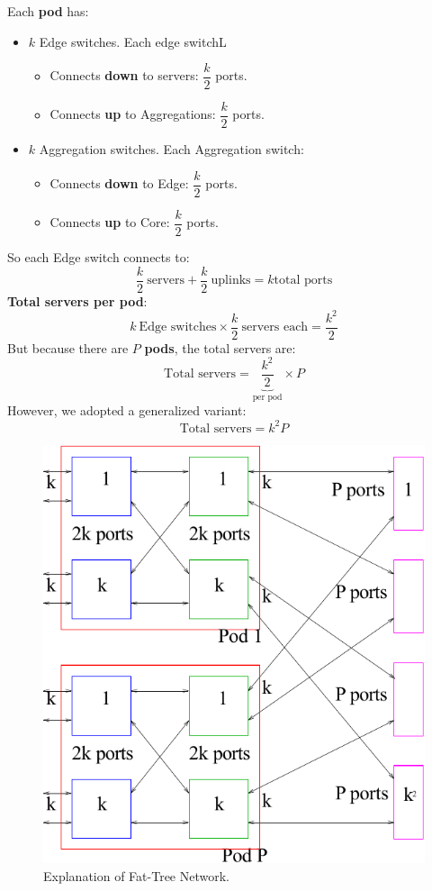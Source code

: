 \highspace
Each \textbf{pod} has:
\begin{itemize}
    \item $k$ Edge switches. Each edge switchL
    \begin{itemize}
        \item Connects \textbf{down} to servers: $\dfrac{k}{2}$ ports.
        \item Connects \textbf{up} to Aggregations: $\dfrac{k}{2}$ ports.
    \end{itemize}
    \item $k$ Aggregation switches. Each Aggregation switch:
    \begin{itemize}
        \item Connects \textbf{down} to Edge: $\dfrac{k}{2}$ ports.
        \item Connects \textbf{up} to Core: $\dfrac{k}{2}$ ports.
    \end{itemize}
\end{itemize}
So each Edge switch connects to:
\begin{equation*}
    \dfrac{k}{2} \: \text{servers} + \dfrac{k}{2} \: \text{uplinks} = k \text{total ports}
\end{equation*}
\textbf{Total servers per pod}:
\begin{equation*}
    k \: \text{Edge switches} \times \dfrac{k}{2} \: \text{servers each} = \dfrac{k^2}{2}
\end{equation*}
But because there are $P$ \textbf{pods}, the total servers are:
\begin{equation*}
    \text{Total servers} = \underbrace{\dfrac{k^2}{2}}_{\text{per pod}} \times P
\end{equation*}
However, we adopted a generalized variant:
\begin{equation}
    \text{Total servers} = k^2 P
\end{equation}

\begin{figure}[!htp]
    \centering
    \includegraphics[width=.5\textwidth]{img/networking-10.pdf}
    \caption{Explanation of Fat-Tree Network.}
\end{figure}


